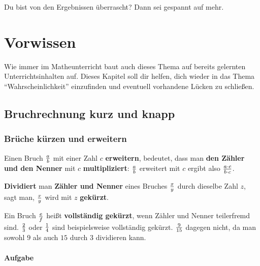 \documentclass[
  ngerman,
]{book}
\begin{document}
Du bist von den Ergebnissen überrascht? Dann sei gespannt auf mehr.

\hypertarget{vorwissen}{%
\chapter{Vorwissen}\label{vorwissen}}

Wie immer im Matheunterricht baut auch dieses Thema auf bereits gelernten Unterrichtsinhalten auf. Dieses Kapitel soll dir helfen, dich wieder in das Thema ``Wahrscheinlichkeit'' einzufinden und eventuell vorhandene Lücken zu schließen.

\hypertarget{bruchrechnung-kurz-und-knapp}{%
\section{Bruchrechnung kurz und knapp}\label{bruchrechnung-kurz-und-knapp}}

\hypertarget{bruxfcche-kuxfcrzen-und-erweitern}{%
\subsection*{Brüche kürzen und erweitern}\label{bruxfcche-kuxfcrzen-und-erweitern}}

Einen Bruch \(a \over b\) mit einer Zahl \(c\) \textbf{erweitern}, bedeutet, dass man \textbf{den Zähler und den Nenner} mit \(c\) \textbf{multipliziert}: \(a \over b\) erweitert mit \(c\) ergibt also \(a \cdot c \over b \cdot c\).

\textbf{Dividiert} man \textbf{Zähler und Nenner} eines Bruches \(x \over y\) durch dieselbe Zahl \(z\), sagt man, \(x \over y\) wird mit \(z\) \textbf{gekürzt}.

Ein Bruch \(e \over f\) heißt \textbf{vollständig gekürzt}, wenn Zähler und Nenner teilerfremd sind. \(2 \over 3\) oder \(1 \over 4\) sind beispielsweise vollständig gekürzt. \(9 \over 15\) dagegen nicht, da man sowohl \(9\) als auch \(15\) durch \(3\) dividieren kann.

\hypertarget{section}{%
\subsubsection*{}\label{section}}

\hypertarget{aufgabe}{%
\subsubsection*{Aufgabe}\label{aufgabe}}
\end{document}
